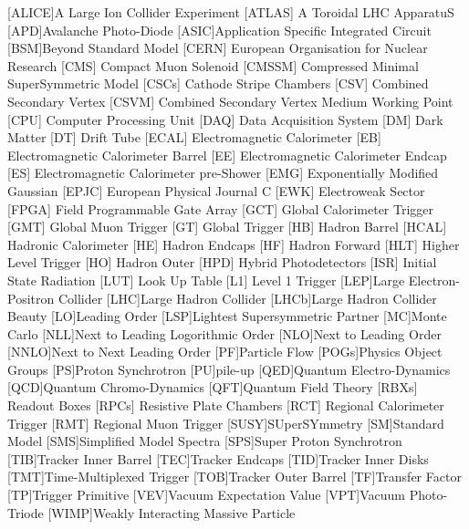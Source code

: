 \begin{acronym}[AAAAAAA]
[ALICE]{A Large Ion Collider Experiment}
 [ATLAS] {A Toroidal LHC ApparatuS}
[APD]{Avalanche Photo-Diode}
[ASIC]{Application Specific Integrated Circuit}
[BSM]{Beyond Standard Model}
 [CERN] {European Organisation for Nuclear Research}
 [CMS] {Compact Muon Solenoid}
 [CMSSM] {Compressed Minimal SuperSymmetric Model}
 [CSCs] {Cathode Stripe Chambers}
 [CSV] {Combined Secondary Vertex}
 [CSVM] {Combined Secondary Vertex Medium Working Point}
 [CPU] {Computer Processing Unit}
 [DAQ] {Data Acquisition System}
 [DM] {Dark Matter}
 [DT] {Drift Tube}
 [ECAL] {Electromagnetic Calorimeter}
 [EB] {Electromagnetic Calorimeter Barrel}
 [EE] {Electromagnetic Calorimeter Endcap}
 [ES] {Electromagnetic Calorimeter pre-Shower}
 [EMG] {Exponentially Modified Gaussian}
 [EPJC] {European Physical Journal C}
 [EWK] {Electroweak Sector}
 [FPGA] {Field Programmable Gate Array}
 [GCT] {Global Calorimeter Trigger}
 [GMT] {Global Muon Trigger}
 [GT] {Global Trigger}
 [HB] {Hadron Barrel}
 [HCAL] {Hadronic Calorimeter}
 [HE] {Hadron Endcaps}
 [HF] {Hadron Forward}
[HLT] {Higher Level Trigger}
 [HO] {Hadron Outer}
 [HPD] {Hybrid Photodetectors}
 [ISR] {Initial State Radiation}
 [LUT] {Look Up Table}
 [L1] {Level 1 Trigger}
[LEP]{Large Electron-Positron Collider}
[LHC]{Large Hadron Collider}
[LHCb]{Large Hadron Collider Beauty}
[LO]{Leading Order}
[LSP]{Lightest Supersymmetric Partner}
[MC]{Monte Carlo}
[NLL]{Next to Leading Logorithmic Order}
[NLO]{Next to Leading Order}
[NNLO]{Next to Next Leading Order}
[PF]{Particle Flow}
[POGs]{Physics Object Groups}
[PS]{Proton Synchrotron}
[PU]{pile-up}
[QED]{Quantum Electro-Dynamics}
[QCD]{Quantum Chromo-Dynamics}
[QFT]{Quantum Field Theory}
 [RBXs] {Readout Boxes}
 [RPCs] {Resistive Plate Chambers}
 [RCT] {Regional Calorimeter Trigger}
 [RMT] {Regional Muon Trigger}
[SUSY]{SUperSYmmetry}
[SM]{Standard Model}
[SMS]{Simplified Model Spectra}
[SPS]{Super Proton Synchrotron}
[TIB]{Tracker Inner Barrel} 
[TEC]{Tracker Endcaps} 
[TID]{Tracker Inner Disks}
[TMT]{Time-Multiplexed Trigger}
[TOB]{Tracker Outer Barrel} 
[TF]{Transfer Factor}
[TP]{Trigger Primitive}
[VEV]{Vacuum Expectation Value}
[VPT]{Vacuum Photo-Triode}
[WIMP]{Weakly Interacting Massive Particle}

\end{acronym}


